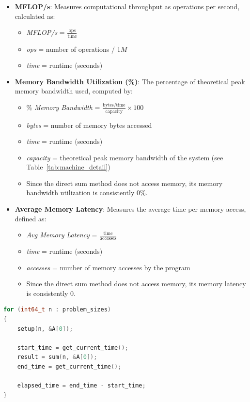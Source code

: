 \begin{itemize}
    \item \textbf{MFLOP/s}: Measures computational throughput as operations per second, calculated as:
    \begin{itemize}
        \item \textit{MFLOP/s} = \(\frac{\text{ops}}{\text{time}}\)
        \item \textit{ops} = number of operations / \(1M\)
        \item \textit{time} = runtime (seconds)
    \end{itemize}
    
    \item \textbf{Memory Bandwidth Utilization (\%)}: The percentage of theoretical peak memory bandwidth used, computed by:
    \begin{itemize}
        \item \% \textit{Memory Bandwidth} = \(\frac{\text{bytes/time}}{\text{capacity}} \times 100\)
        \item \textit{bytes} = number of memory bytes accessed
        \item \textit{time} = runtime (seconds)
        \item \textit{capacity} = theoretical peak memory bandwidth of the system (see Table~\ref{tab:machine_detail})
        \item Since the direct sum method does not access memory, its memory bandwidth utilization is consistently \(0\%\). 
    \end{itemize}
    
    \item \textbf{Average Memory Latency}: Measures the average time per memory access, defined as:
    \begin{itemize}
        \item \textit{Avg Memory Latency} = \(\frac{\text{time}}{\text{accesses}}\)
        \item \textit{time} = runtime (seconds)
        \item \textit{accesses} = number of memory accesses by the program
        \item Since the direct sum method does not access memory, its memory latency is consistently \(0\). 
    \end{itemize}
\end{itemize}

\begin{lstlisting}[caption={Measuring Elapsed Time: },label={listing:measuring-elapsed-time}, name=measuring-elapsed-time, float=htbp, style=mystyle,language=C++]
for (int64_t n : problem_sizes)
{
    setup(n, &A[0]);
    
    start_time = get_current_time();    
    result = sum(n, &A[0]);
    end_time = get_current_time();

    elapsed_time = end_time - start_time;
}
\end{lstlisting}

